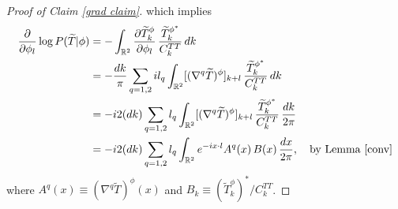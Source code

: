 \documentclass[noinfoline]{imsart}
\begin{document}
\begin{proof}[{ Proof of Claim \ref{grad claim}}]
which implies
\begin{align*}
 \frac{\partial}{\partial \phi_l}\log P(\widetilde T| \phi) &= -\int_{\Bbb R^2} \frac{\partial \widetilde T_k^\phi}{\partial \phi_l} \, \frac{\widetilde T_k^{\phi^*}}{C_k^{TT}}  \,dk  \\
 &= -\frac{dk}{ \pi} \sum_{q=1,2} il_q \int_{\Bbb R^2}  [(\nabla^q\widetilde T)^\phi]_{k+l} \, \frac{\widetilde T_k^{\phi^*}}{C_k^{TT}}  \,dk \\
 &= -  i 2 (dk) \sum_{q=1,2} l_q \int_{\Bbb R^2}  [(\nabla^q\widetilde T)^\phi]_{k+l} \, \frac{\widetilde T_k^{\phi^*}}{C_k^{TT}}  \,\frac{dk}{2\pi} \\
 & = -  i 2 (dk) \sum_{q=1,2} l_q \int_{\Bbb R^2} e^{-i x\cdot l} A^q(x) \, B(x)  \,\frac{dx}{2\pi},\quad\text{by Lemma \ref{conv}}
 \end{align*}
 where $A^q(x) \equiv (\nabla^q\widetilde T)^\phi(x)$ and $B_k\equiv (\widetilde T_k^{\phi})^* / C_k^{TT}$.
\end{proof}
\end{document}
